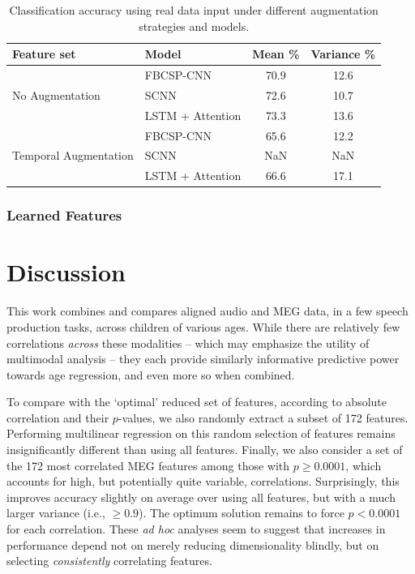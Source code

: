 \documentclass[utf8]{frontiersSCNS} %
\begin{document}
\begin{table}[t]
  \centering
  \label{tab:end2end_results}
  \begin{tabular}{l l | c | c}
    \toprule
    \textbf{Feature set} & \textbf{Model} & \textbf{Mean \%} & \textbf{Variance \%} \\
    \toprule
    \multirow{3}{*}{No Augmentation}
                         & FBCSP-CNN           & 70.9 & 12.6  \\
                         & SCNN                & 72.6 & 10.7  \\
                         & LSTM + Attention    & 73.3 & 13.6  \\ 
    \midrule
    \multirow{3}{*}{Temporal Augmentation}
                         & FBCSP-CNN           & 65.6 & 12.2  \\
                         & SCNN                & NaN & NaN  \\
                         & LSTM + Attention    & 66.6 & 17.1  \\ 
    \bottomrule
  \end{tabular}
  \caption{Classification accuracy using real data input under different augmentation strategies and models.}
\end{table}

\subsubsection{Learned Features}

\section{Discussion}


This work combines and compares aligned audio and MEG data, in a few speech production tasks, across children of various ages. While there are relatively few correlations {\em across} these modalities -- which may emphasize the utility of multimodal analysis -- they each provide similarly informative predictive power towards age regression, and even more so when combined.

To compare with the `optimal' reduced set of features, according to absolute correlation and their $p$-values, we also randomly extract a subset of 172 features. Performing multilinear regression on this random selection of features remains insignificantly different than using all features. Finally, we also consider a set of the 172 most correlated MEG features among those with $p \geq 0.0001$, which accounts for high, but potentially quite variable, correlations. Surprisingly, this improves accuracy slightly on average over using all features, but with a much larger variance (i.e., $\geq 0.9$). The optimum solution remains to force $p<0.0001$ for each correlation. These {\em ad hoc} analyses seem to suggest that increases in performance depend not on merely reducing dimensionality blindly, but on selecting {\em consistently} correlating features. %
\end{document}
